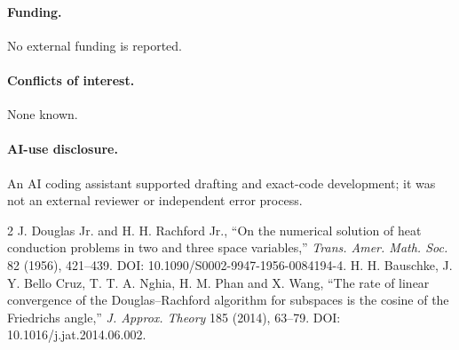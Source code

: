 \documentclass[9pt]{extarticle}
\begin{document}
\paragraph{Funding.} No external funding is reported.
\paragraph{Conflicts of interest.} None known.
\paragraph{AI-use disclosure.} An AI coding assistant supported drafting and
exact-code development; it was not an external reviewer or independent error
process.

\begin{thebibliography}{2}
 J. Douglas Jr. and H. H. Rachford Jr., ``On the numerical
solution of heat conduction problems in two and three space variables,''
\emph{Trans. Amer. Math. Soc.} 82 (1956), 421--439.
DOI: 10.1090/S0002-9947-1956-0084194-4.
 H. H. Bauschke, J. Y. Bello Cruz, T. T. A. Nghia, H. M. Phan
and X. Wang, ``The rate of linear convergence of the Douglas--Rachford
algorithm for subspaces is the cosine of the Friedrichs angle,''
\emph{J. Approx. Theory} 185 (2014), 63--79.
DOI: 10.1016/j.jat.2014.06.002.
\end{thebibliography}
\end{document}
